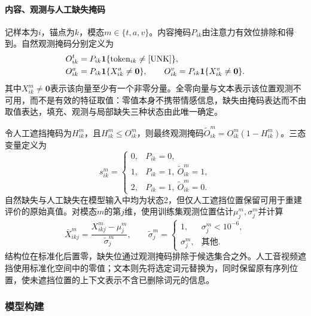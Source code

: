 \paragraph{内容、观测与人工缺失掩码}
记样本为$i$，锚点为$k$，模态$m\in\{t,a,v\}$。内容掩码$P_{ik}$由注意力有效位排除\file{[CLS]}和\file{[SEP]}得到。自然观测掩码分别定义为
\begin{align}
 O^t_{ik}&=P_{ik}\mathbf 1\{\mathrm{token}_{ik}\ne[\mathrm{UNK}]\},\\
 O^a_{ik}&=P_{ik}\mathbf 1\{X^a_{ik}\ne\bm0\},\qquad
 O^v_{ik}=P_{ik}\mathbf 1\{X^v_{ik}\ne\bm0\}.
\end{align}
其中$X^m_{ik}\ne\bm0$表示该向量至少有一个非零分量。全零向量与文本\file{[UNK]}表示该位置观测不可用，而不是有效的特征取值：零值本身不携带情感信息，缺失由掩码表达而不由取值表达，填充、观测与局部缺失三种状态由此唯一确定。

令人工遮挡掩码为$H^m_{ik}$，且$H^m_{ik}\le O^m_{ik}$，则最终观测掩码$\widetilde O^m_{ik}=O^m_{ik}(1-H^m_{ik})$。三态变量定义为
\begin{equation}
s^m_{ik}=\begin{cases}
0,&P_{ik}=0,\\1,&P_{ik}=1,\ \widetilde O^m_{ik}=1,\\2,&P_{ik}=1,\ \widetilde O^m_{ik}=0.
\end{cases}
\end{equation}
自然缺失与人工缺失在模型输入中均为状态2，但仅人工遮挡位置保留可用于重建评价的原始真值。对模态$m$的第$j$维，使用训练集观测位置估计$\mu^m_j,\sigma^m_j$并计算
\begin{equation}
\bar X^m_{ikj}=\frac{X^m_{ikj}-\mu^m_j}{\widetilde\sigma^m_j},\qquad
\widetilde\sigma^m_j=\begin{cases}1,&\sigma^m_j<10^{-6},\\\sigma^m_j,&\text{其他}.
\end{cases}
\end{equation}
结构位在标准化后置零，缺失位通过观测掩码排除于候选集合之外。人工音视频遮挡使用标准化空间中的零值；文本则先将选定词元替换为，同时保留原有序列位置，使未遮挡位置的上下文表示不含已删除词元的信息。

\subsubsection{模型构建}

